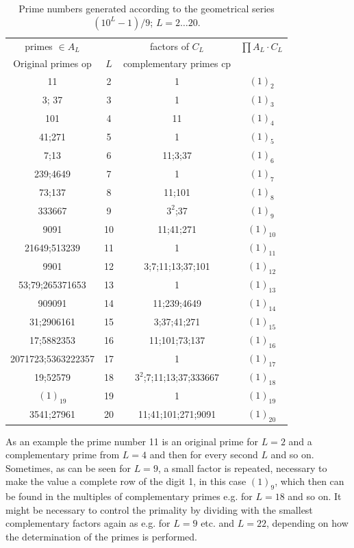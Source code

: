 \documentclass[10pt,twoside,a4paper]{amsart}
\begin{document}
\begin{table}[h!]
\begin{tabular}{c c c c}
primes $\in A_{L}$ & & factors of $C_{L}$ & $\prod A_{L}\cdot C_{L}$ \\
Original primes op & $L$ & complementary primes cp & \\
\hline
11 & 2 & 1 & $(1)_{2}$\\
3; 37 & 3 & 1 & $(1)_{3}$\\
101 & 4 & 11 & $(1)_{4}$\\
41;271 & 5 & 1 & $(1)_{5}$\\
7;13 & 6 & 11;3;37 & $(1)_{6}$\\
239;4649 & 7 & 1 & $(1)_{7}$\\
73;137 & 8 & 11;101 & $(1)_{8}$\\
333667 & 9 & $3^2$;37 & $(1)_{9}$\\
9091 & 10 & 11;41;271 & $(1)_{10}$\\
21649;513239 & 11 & 1 & $(1)_{11}$\\
9901 & 12 & 3;7;11;13;37;101 & $(1)_{12}$\\
53;79;265371653 & 13 & 1 & $(1)_{13}$\\
909091 & 14 & 11;239;4649 & $(1)_{14}$\\
31;2906161 & 15 & 3;37;41;271 & $(1)_{15}$\\
17;5882353 & 16 & 11;101;73;137 & $(1)_{16}$\\
2071723;5363222357 & 17 & 1 & $(1)_{17}$\\
19;52579 & 18 & $3^{2}$;7;11;13;37;333667 & $(1)_{18}$\\
$(1)_{19}$ & 19 & 1 & $(1)_{19}$\\
3541;27961 & 20 & 11;41;101;271;9091 & $(1)_{20}$\\ 
\end{tabular}
\caption{Prime numbers generated according to the geometrical series $(10^{L}-1)/9$; $L=2\ldots20$.}
\label{primetable}
\end{table}

As an example the prime number 11 is an original prime for $L = 2$ and a complementary prime from $L = 4$ and then for every second $L$ and so on. Sometimes, as can be seen for $L = 9$, a small factor is repeated, necessary to make the value a complete row of the digit 1, in this case $(1)_{9}$, which then can be found in the multiples of complementary primes e.g. for $L = 18$ and so on. It might be necessary to control the primality by dividing with the smallest complementary factors again as e.g. for $L=9$ etc. and $L=22$, depending on how the determination of the primes is performed.
\end{document}
